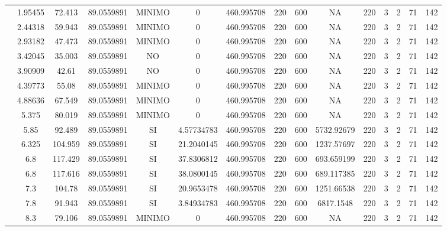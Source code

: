 \begin{table}[H]
{\begin{tabular}{|c|c|c|c|c|c|c|c|c|c|c|c|c|c|c|}
\cline{2-15}    & 1.95455 & 72.413 & 89.0559891 & MINIMO & 0   & 460.995708 & 220 & 600 & NA  & 220 & 3   & 2   & 71  & 142 \bigstrut\\
\cline{2-15}    & 2.44318 & 59.943 & 89.0559891 & MINIMO & 0   & 460.995708 & 220 & 600 & NA  & 220 & 3   & 2   & 71  & 142 \bigstrut\\
\cline{2-15}    & 2.93182 & 47.473 & 89.0559891 & MINIMO & 0   & 460.995708 & 220 & 600 & NA  & 220 & 3   & 2   & 71  & 142 \bigstrut\\
\cline{2-15}    & 3.42045 & 35.003 & 89.0559891 & NO  & 0   & 460.995708 & 220 & 600 & NA  & 220 & 3   & 2   & 71  & 142 \bigstrut\\
\cline{2-15}    & 3.90909 & 42.61 & 89.0559891 & NO  & 0   & 460.995708 & 220 & 600 & NA  & 220 & 3   & 2   & 71  & 142 \bigstrut\\
\cline{2-15}    & 4.39773 & 55.08 & 89.0559891 & MINIMO & 0   & 460.995708 & 220 & 600 & NA  & 220 & 3   & 2   & 71  & 142 \bigstrut\\
\cline{2-15}    & 4.88636 & 67.549 & 89.0559891 & MINIMO & 0   & 460.995708 & 220 & 600 & NA  & 220 & 3   & 2   & 71  & 142 \bigstrut\\
\cline{2-15}    & 5.375 & 80.019 & 89.0559891 & MINIMO & 0   & 460.995708 & 220 & 600 & NA  & 220 & 3   & 2   & 71  & 142 \bigstrut\\
\cline{2-15}    & 5.85 & 92.489 & 89.0559891 & SI  & 4.57734783 & 460.995708 & 220 & 600 & 5732.92679 & 220 & 3   & 2   & 71  & 142 \bigstrut\\
\cline{2-15}    & 6.325 & 104.959 & 89.0559891 & SI  & 21.2040145 & 460.995708 & 220 & 600 & 1237.57697 & 220 & 3   & 2   & 71  & 142 \bigstrut\\
\cline{2-15}    & 6.8 & 117.429 & 89.0559891 & SI  & 37.8306812 & 460.995708 & 220 & 600 & 693.659199 & 220 & 3   & 2   & 71  & 142 \bigstrut\\
\cline{2-15}    & 6.8 & 117.616 & 89.0559891 & SI  & 38.0800145 & 460.995708 & 220 & 600 & 689.117385 & 220 & 3   & 2   & 71  & 142 \bigstrut\\
\cline{2-15}    & 7.3 & 104.78 & 89.0559891 & SI  & 20.9653478 & 460.995708 & 220 & 600 & 1251.66538 & 220 & 3   & 2   & 71  & 142 \bigstrut\\
\cline{2-15}    & 7.8 & 91.943 & 89.0559891 & SI  & 3.84934783 & 460.995708 & 220 & 600 & 6817.1548 & 220 & 3   & 2   & 71  & 142 \bigstrut\\
\cline{2-15}    & 8.3 & 79.106 & 89.0559891 & MINIMO & 0   & 460.995708 & 220 & 600 & NA  & 220 & 3   & 2   & 71  & 142 \bigstrut\\

\end{tabular}}
\end{table}
